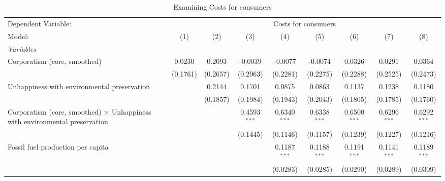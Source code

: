
\begin{table}[htbp]
   \caption{Examining Costs for consumers}
   \centering
   \begin{tabular}{lcccccccc}
      \tabularnewline \midrule \midrule
      Dependent Variable: & \multicolumn{8}{c}{Costs for consumers}\\
      Model:                                                                             & (1)      & (2)      & (3)            & (4)            & (5)            & (6)            & (7)            & (8)\\  
      \midrule
      \emph{Variables}\\
      Corporatism (core, smoothed)                                                       & 0.0230   & 0.2093   & -0.0039        & -0.0077        & -0.0074        & 0.0326         & 0.0291         & 0.0364\\   
                                                                                         & (0.1761) & (0.2657) & (0.2963)       & (0.2281)       & (0.2275)       & (0.2288)       & (0.2525)       & (0.2473)\\   
      Unhappiness with environmental preservation                                        &          & 0.2144   & 0.1701         & 0.0875         & 0.0863         & 0.1137         & 0.1238         & 0.1180\\   
                                                                                         &          & (0.1857) & (0.1984)       & (0.1943)       & (0.2043)       & (0.1805)       & (0.1785)       & (0.1760)\\   
      Corporatism (core, smoothed) $\times$ Unhappiness with environmental preservation  &          &          & 0.4593$^{***}$ & 0.6340$^{***}$ & 0.6338$^{***}$ & 0.6500$^{***}$ & 0.6296$^{***}$ & 0.6292$^{***}$\\   
                                                                                         &          &          & (0.1445)       & (0.1146)       & (0.1157)       & (0.1239)       & (0.1227)       & (0.1216)\\   
      Fossil fuel production per capita                                                  &          &          &                & 0.1187$^{***}$ & 0.1188$^{***}$ & 0.1191$^{***}$ & 0.1141$^{***}$ & 0.1189$^{***}$\\   
                                                                                         &          &          &                & (0.0283)       & (0.0285)       & (0.0290)       & (0.0289)       & (0.0309)\\   

\end{tabular}
\end{table}
